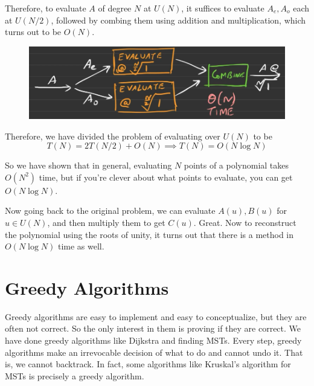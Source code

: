 \documentclass{article}
\begin{document}
    Therefore, to evaluate $A$ of degree $N$ at $U(N)$, it suffices to evaluate $A_e, A_o$ each at $U(N/2)$, followed by combing them using addition and multiplication, which turns out to be $O(N)$. 

    \begin{figure}[H]
      \centering 
      \includegraphics[scale=0.4]{img/fft.png}
      \caption{} 
      \label{fig:fft}
    \end{figure}

    \begin{algo}
      
      \begin{algorithm}[H]
        \label{alg:unity}
        \begin{algorithmic}
          \Require{}
          \State 
          \EndFunction
        \end{algorithmic}
      \end{algorithm}
    \end{algo}

    Therefore, we have divided the problem of evaluating over $U(N)$ to be 
    \begin{equation}
      T(N) = 2 T(N/2) + O(N) \implies T(N) = O( N \log{N}) 
    \end{equation}

    So we have shown that in general, evaluating $N$ points of a polynomial takes $O(N^2)$ time, but if you're clever about what points to evaluate, you can get $O(N \log N)$. 

    Now going back to the original problem, we can evaluate $A(u), B(u)$ for $u \in U(N)$, and then multiply them to get $C(u)$. Great. Now to reconstruct the polynomial using the roots of unity, it turns out that there is a method in $O(N \log{N})$ time as well. 

\section{Greedy Algorithms}

    Greedy algorithms are easy to implement and easy to conceptualize, but they are often not correct. So the only interest in them is proving if they are correct. We have done greedy algorithms like Dijkstra and finding MSTs. Every step, greedy algorithms make an irrevocable decision of what to do and cannot undo it. That is, we cannot backtrack. In fact, some algorithms like Kruskal's algorithm for MSTs is precisely a greedy algorithm. 
    
\end{document}
